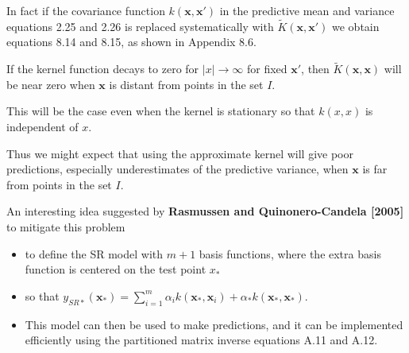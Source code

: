 \documentclass[
  ignorenonframetext,
]{beamer}
\begin{document}
\begin{frame}{}
\protect\hypertarget{section-10}{}
In fact if the covariance function \(k(\pmb x, \pmb x')\) in the
predictive mean and variance equations 2.25 and 2.26 is replaced
systematically with \({\tilde K}(\pmb x, \pmb x')\) we obtain equations
8.14 and 8.15, as shown in Appendix 8.6.

If the kernel function decays to zero for \(|x| \rightarrow \infty\) for
fixed \(\pmb x'\), then \({\tilde K}(\pmb x, \pmb x)\) will be near zero
when \(\pmb x\) is distant from points in the set \(I\).

This will be the case even when the kernel is stationary so that
\(k(x, x)\) is independent of \(x\).

Thus we might expect that using the approximate kernel will give poor
predictions, especially underestimates of the predictive variance, when
\(\pmb x\) is far from points in the set \(I\).
\end{frame}

\begin{frame}{}
\protect\hypertarget{section-11}{}
An interesting idea suggested by \textbf{Rasmussen and Quinonero-Candela
{[}2005{]}} to mitigate this problem

\begin{itemize}
\item
  to define the SR model with \(m + 1\) basis functions, where the extra
  basis function is centered on the test point \(x_*\)
\item
  so that
  \(y_{SR*} (\pmb x_*) = \sum^m_{i=1} \alpha_i k(\pmb x_* , \pmb x_i) + \alpha_* k(\pmb x_* , \pmb x_*)\).
\item
  This model can then be used to make predictions, and it can be
  implemented efficiently using the partitioned matrix inverse equations
  A.11 and A.12.
\end{itemize}
\end{frame}
\end{document}
